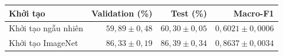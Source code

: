 \begin{tabular}{lrrr}
\toprule
Khởi tạo & Validation (\%) & Test (\%) & Macro-F1 \\
\midrule
Khởi tạo ngẫu nhiên & $59{,}89 \pm 0{,}48$ & $60{,}30 \pm 0{,}05$ & $0{,}6021 \pm 0{,}0006$ \\
Khởi tạo ImageNet & $86{,}33 \pm 0{,}19$ & $86{,}39 \pm 0{,}34$ & $0{,}8637 \pm 0{,}0034$ \\
\bottomrule
\end{tabular}
